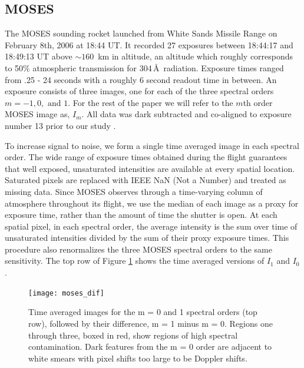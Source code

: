 	\subsection{MOSES}\label{sec:MOSES_data}
	
		The MOSES sounding rocket launched from White Sands Missile Range on February 8th, 2006 at 18:44 UT. 
		It recorded 27 exposures between 18:44:17 and 18:49:13 UT above $\sim 160$\, km in altitude, an altitude which roughly corresponds to 50\% atmospheric transmission for 304\,\AA\ radiation.  
		Exposure times ranged from .25 - 24 seconds with a roughly 6 second readout time in between.  
		An exposure consists of three images, one for each of the three spectral orders $m = -1, 0, \text{\ and\ } 1$.
		For the rest of the paper we will refer to the $m$th order MOSES image as, $I_m$.  
		All data was dark subtracted and co-aligned to exposure number 13 prior to our study \citep{Fox2010}. 
		
    	To increase signal to noise, we form a single time averaged image in each spectral order. The wide range of exposure times obtained during the flight guarantees that well exposed, unsaturated intensities are available at every spatial location.
    	Saturated pixels are replaced with IEEE NaN (Not a Number) and treated as missing data.
		Since MOSES observes through a time-varying column of atmosphere throughout its flight, we use the median of each image as a proxy for exposure time, rather than the amount of time the shutter is open.
		At each spatial pixel, in each spectral order, the average intensity is the sum over time of unsaturated intensities divided by the sum of their proxy exposure times. This procedure also renormalizes the three MOSES spectral orders to the same sensitivity.
		The top row of Figure \ref{fig:moses_super} shows the time averaged versions of $I_1$ and $I_0$. 
		
		
		\begin{figure}
			\centering
			\texttt{[image: moses\_dif]}
			\caption{Time averaged images for the m = 0 and 1 spectral orders (top row), followed by their difference, m = 1 minus m = 0.  Regions one through three, boxed in red, show regions of high spectral contamination. Dark features from the m = 0 order are adjacent to white smears with pixel shifts too large to be Doppler shifts.}
			\label{fig:moses_super}
		\end{figure}
	
